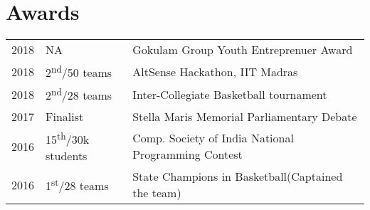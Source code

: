 \documentclass[]{deedy-resume-openfont}
\begin{document}
\begin{minipage}[t]{0.66\textwidth}
\begin{tightemize}
    \end{tightemize}
    \section{Awards} 
    \begin{tabular}{rll}
    2018	     & NA  & Gokulam Group Youth Entreprenuer Award\\
    2018	     & 2\textsuperscript{nd}/50 teams  &AltSense Hackathon, IIT Madras
    \\
    2018	  & 2\textsuperscript{nd}/28 teams  & Inter-Collegiate Basketball tournament \\
    2017     & Finalist & Stella Maris Memorial Parliamentary Debate  \\
    2016 & 15\textsuperscript{th}/30k students & Comp. Society of India National Programming
    Contest \\
    2016 & 1\textsuperscript{st}/28 teams& State Champions in Basketball(Captained the team)
    
    
    
    \end{tabular}
    \sectionsep
    
    
    
    
    \end{minipage} 
    
\end{document}
